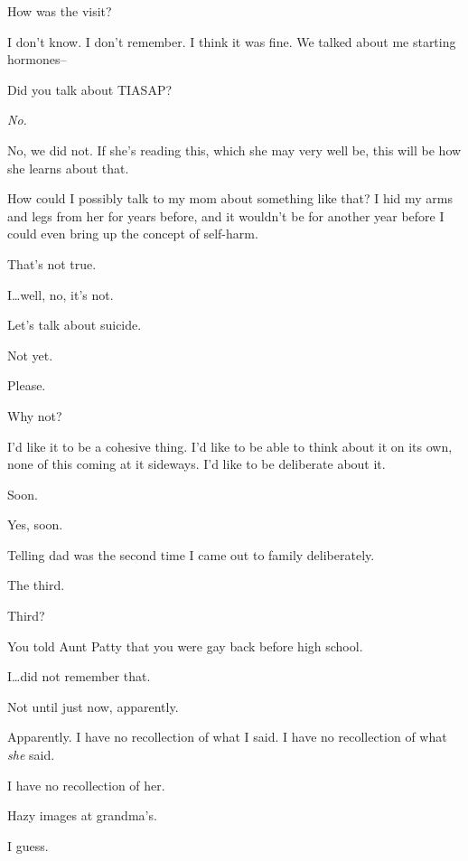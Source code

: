 \begin{ally}
How was the visit?
\end{ally}
I don't know. I don't remember. I think it was fine. We talked about me starting hormones--

\begin{ally}
Did you talk about TIASAP?
\end{ally}
\emph{No.}

No, we did not. If she's reading this, which she may very well be, this will be how she learns about that.

How could I possibly talk to my mom about something like that? I hid my arms and legs from her for years before, and it wouldn't be for another year before I could even bring up the concept of self-harm.

\begin{ally}
That's not true.
\end{ally}
I\ldots{}well, no, it's not.

\begin{ally}
Let's talk about suicide.
\end{ally}
Not yet.

Please.

\begin{ally}
Why not?
\end{ally}
I'd like it to be a cohesive thing. I'd like to be able to think about it on its own, none of this coming at it sideways. I'd like to be deliberate about it.

\begin{ally}
Soon.
\end{ally}
Yes, soon.
\newpage

Telling dad was the second time I came out to family deliberately.

\begin{ally}
The third.
\end{ally}
Third?

\begin{ally}
You told Aunt Patty that you were gay back before high school.
\end{ally}
I\ldots{}did not remember that.

\begin{ally}
Not until just now, apparently.
\end{ally}
Apparently. I have no recollection of what I said. I have no recollection of what \emph{she} said.

I have no recollection of her.

\begin{ally}
Hazy images at grandma's.
\end{ally}
I guess.


